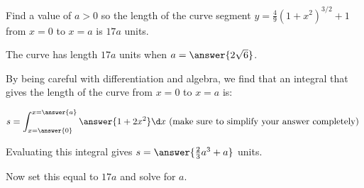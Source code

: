 \documentclass{ximera}
\author{Jim Talamo}
\begin{document}
\begin{exercise}

Find a value of $a>0$ so the length of the curve segment $y=\frac{4}{9}\left(1+x^2\right)^{3/2} +1$ from $x=0$ to $x=a$ is $17a$ units.



The curve has length $17a$ units when $a=\answer{2\sqrt{6}}$.

\begin{hint}
By being careful with differentiation and algebra, we find that an integral that gives the length of the curve from $x=0$ to $x=a$ is:

\[
s= \int_{x=\answer{0}}^{x=\answer{a}} \answer{ 1+2x^2} \d x \textrm{ (make sure to simplify your answer completely) }
\]

Evaluating this integral gives $s = \answer{\frac{2}{3}a^3+a}$ units.

Now set this equal to $17a$ and solve for $a$.
\end{hint}

\end{exercise}
\end{document}
